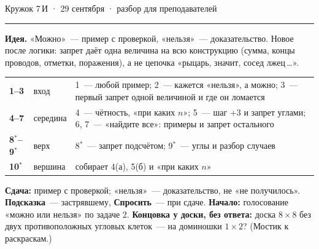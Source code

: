 \documentclass[10pt,a4paper]{article}
\begin{document}
\hfill{\small Кружок 7\,И · 29 сентября · разбор для преподавателей}
\vspace{3pt}\hrule\vspace{5pt}

\textbf{Идея.} «Можно»~--- пример с проверкой, «нельзя»~--- доказательство. Новое после логики: запрет даёт одна величина
на всю конструкцию (сумма, концы проводов, отметки, поражения), а не цепочка «рыцарь, значит, сосед лжец\,\ldots».

\vspace{3pt}
\noindent\small\begin{tabularx}{\linewidth}{@{}l l X@{}}
\textbf{1--3} & вход & 1~--- любой пример; 2~--- кажется «нельзя», а можно; 3~--- первый запрет одной величиной и где он ломается\\
\textbf{4--7} & середина & 4~--- чётность, «при каких $n$»; 5~--- шаг $+3$ и запрет углами; 6, 7~--- «найдите все»: примеры и запрет остального\\
\textbf{8$^*$--9$^*$} & верх & 8$^*$~--- запрет подсчётом; 9$^*$~--- углы и разбор случаев\\
\textbf{10$^*$} & вершина & собирает 4(а), 5(б) и «при каких $n$»\\
\end{tabularx}\normalsize

\vspace{3pt}
\textbf{Сдача:} пример с проверкой; «нельзя»~--- доказательство, не «не получилось». \textbf{Подсказка}~--- застрявшему, \textbf{Спросить}~--- при сдаче.
\textbf{Начало:} голосование «можно или нельзя» по задаче 2.
\textbf{Концовка у доски, без ответа:} доска $8\times8$ без двух противоположных угловых клеток~--- на доминошки $1\times2$? (Мостик к раскраскам.)
\end{document}
